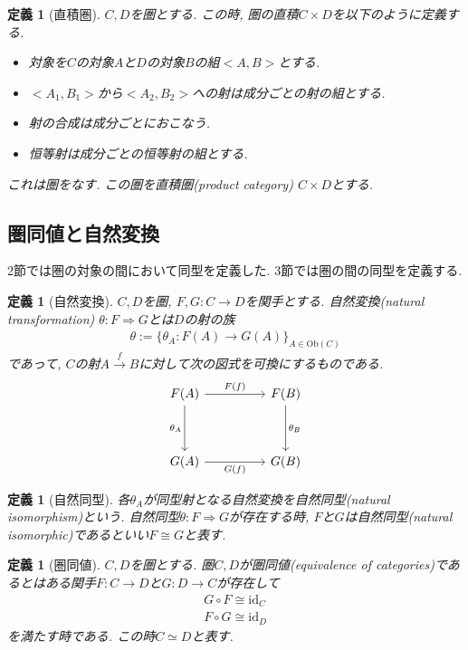 \documentclass[a4paper,12pt]{ltjsarticle}
\theoremstyle{break}
\newtheorem{defn}[thm]{定義}
\newcommand{\Ob}{\mathrm{Ob}}
\newcommand{\xr}[1]{\xrightarrow{#1}}
\newcommand{\id}{\mathrm{id}}
\newcommand{\ci}{\circ}
\newcommand{\ra}{\Rightarrow}
\newcommand{\ti}{\times}
\numberwithin{equation}{section}
\begin{document}
\begin{defn}[直積圏]
  $C,D$を圏とする. 
  この時, 圏の直積$C \ti D$を以下のように定義する. 
  \begin{itemize}
    \item 対象を$C$の対象$A$と$D$の対象$B$の組$<A,B>$とする.
    \item $<A_1,B_1>$から$<A_2,B_2>$への射は成分ごとの射の組とする.
    \item 射の合成は成分ごとにおこなう.
    \item 恒等射は成分ごとの恒等射の組とする.
  \end{itemize}
  これは圏をなす. 
  この圏を直積圏(product category) $C \ti D$とする. 
\end{defn}

\subsection{圏同値と自然変換}

2節では圏の対象の間において同型を定義した. 
3節では圏の間の同型を定義する. 

\begin{defn}[自然変換]
  $C, D$を圏, $F, G: C \to D$を関手とする. 
  自然変換(natural transformation) $\theta: F \ra G$とは$D$の射の族
  \begin{align*}
    \theta := \{ \theta_A: F(A) \to G(A) \}_{A \in \Ob(C)}
  \end{align*}
  であって, $C$の射$A \xr{f} B$に対して次の図式を可換にするものである. 
  \[\begin{tikzcd}
	  {F(A)} && {F(B)} \\
	  \\
	  {G(A)} && {G(B)}
	  \arrow["{\theta_A}"', from=1-1, to=3-1]
	  \arrow["{F(f)}", from=1-1, to=1-3]
	  \arrow["{\theta_B}", from=1-3, to=3-3]
	  \arrow["{G(f)}"', from=3-1, to=3-3]
  \end{tikzcd}\]
\end{defn}

\begin{defn}[自然同型]
  各$\theta_A$が同型射となる自然変換を自然同型(natural isomorphism)という. 
  自然同型$\theta: F \ra G$が存在する時, $F$と$G$は自然同型(natural isomorphic)であるといい$F \cong G$と表す. 
\end{defn}

\begin{defn}[圏同値]
  $C,D$を圏とする. 
  圏$C,D$が圏同値(equivalence of categories)であるとはある関手$F: C \to D$と$G: D \to C$が存在して
  \begin{align*}
  G \ci F \cong \id_C \\
  F \ci G \cong \id_D
  \end{align*}
  を満たす時である. 
  この時$C \simeq D$と表す. 
\end{defn}
\end{document}
